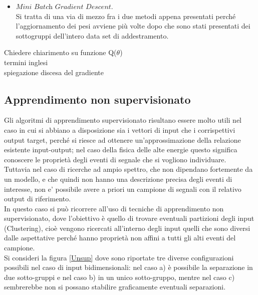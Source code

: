 \begin{itemize}
	\item $\textit{Mini Batch Gradient Descent}$. \\
	Si tratta di una via di mezzo fra i due metodi appena presentati perché l'aggiornamento dei pesi avviene più volte dopo che sono stati presentati dei sottogruppi dell'intero data set di addestramento. 
	
\end{itemize}

\color{red}
Chiedere chiarimento su funzione Q($\theta$) \\


termini inglesi \\
spiegazione discesa del gradiente \\
\color{black}

\newpage


\subsection{Apprendimento non supervisionato}
\label{app_non_sup}

Gli algoritmi di apprendimento supervisionato risultano essere molto utili nel caso in cui si abbiano a disposizione sia i vettori di input che i corrispettivi output target, perché si riesce ad ottenere un'approssimazione della relazione esistente input-output; nel caso della fisica delle alte energie questo significa conoscere le proprietà degli eventi di segnale che si vogliono individuare.\\
Tuttavia nel caso di ricerche ad ampio spettro, che non dipendano fortemente da un modello, e che quindi non hanno una descrizione precisa degli eventi di interesse, non e' possibile avere a priori un campione di segnali con il relativo output di riferimento. \\
In questo caso si può ricorrere all'uso di tecniche di apprendimento non supervisionato, dove l'obiettivo è quello di trovare eventuali partizioni degli input (Clustering), cioè vengono ricercati all'interno degli input quelli che sono diversi dalle aspettative perché hanno proprietà non affini a tutti gli alti eventi del campione. \\
Si consideri la figura \ref{Unsup} dove sono riportate tre diverse configurazioni possibili nel caso di input bidimensionali: nel caso a) è possibile la separazione in due sotto-gruppi e nel caso b) in un unico sotto-gruppo, mentre nel caso c) sembrerebbe non si possano stabilire graficamente eventuali separazioni.

